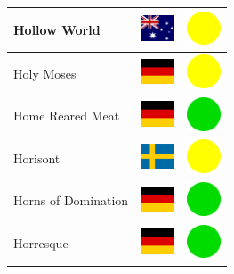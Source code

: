 \documentclass[12pt, a4paper, twoside]{report}
\begin{document}
\begin{center}
\begin{longtable}{|p{5cm}|p{2cm}|p{2cm}|}
Hollow World & \includegraphics[width=1cm]{4x3/au} & \includegraphics[width=1cm]{likes/m} \\ \hline
Holy Moses & \includegraphics[width=1cm]{4x3/de} & \includegraphics[width=1cm]{likes/m} \\ \hline
Home Reared Meat & \includegraphics[width=1cm]{4x3/de} & \includegraphics[width=1cm]{likes/y} \\ \hline
Horisont & \includegraphics[width=1cm]{4x3/se} & \includegraphics[width=1cm]{likes/m} \\ \hline
Horns of Domination & \includegraphics[width=1cm]{4x3/de} & \includegraphics[width=1cm]{likes/y} \\ \hline
Horresque & \includegraphics[width=1cm]{4x3/de} & \includegraphics[width=1cm]{likes/y} \\ \hline

\end{longtable}
\end{center}
\end{document}
